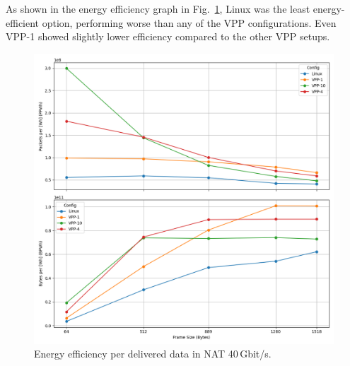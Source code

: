 As shown in the energy efficiency graph in Fig.~\ref{fig:nat-40g}, Linux was the least energy-efficient option, performing worse than any of the VPP configurations.
Even VPP-1 showed slightly lower efficiency compared to the other VPP setups.

\begin{figure}[!htbp]
    \centering
    \includegraphics[width=\linewidth]{images/consumption-nat-40g.png}
    \caption{Energy efficiency per delivered data in NAT 40\,Gbit/s.}
    \label{fig:nat-40g}
\end{figure}

